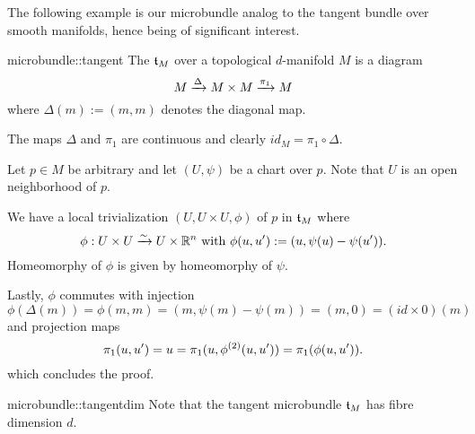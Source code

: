 \begin{myparagraph}
    The following example is our microbundle analog
    to the tangent bundle over smooth manifolds,
    hence being of significant interest.
\end{myparagraph}

\begin{myexample}{microbundle::tangent}
    The  $\mathfrak{t}_M$ over a topological $d$-manifold $M$ is a diagram
    \[ M \xrightarrow{\Delta} M \times M \xrightarrow{\pi_1} M{} \]
    where $\Delta(m) := (m, m)$ denotes the diagonal map.
\end{myexample}

\begin{myproof}
    The maps $\Delta$ and $\pi_1$ are continuous and clearly $id_M = \pi_1 \circ \Delta$.

    Let $p \in M$ be arbitrary and let $(U, \psi)$ be a chart over $p$.
    Note that $U$ is an open neighborhood of $p$.
    
    We have a local trivialization $(U, U \times U, \phi)$ of $p$ in $\mathfrak{t}_M$ where
    \[ \phi: U \times U \xrightarrow{\sim} U \times \mathbb{R}^n \text{ with } \phi(u, u') := (u, \psi(u) - \psi(u')). \]
    Homeomorphy of $\phi$ is given by homeomorphy of $\psi$.

    Lastly, $\phi$ commutes with injection
    \[ \phi(\Delta(m)) = \phi(m, m) = (m, \psi(m) - \psi(m)) = (m, 0) = (id \times 0)(m)\]
    and projection maps
    \[ \pi_1(u, u') = u = \pi_1(u, \phi^{(2)}(u, u')) = \pi_1(\phi(u, u')). \]
    which concludes the proof.
\end{myproof}

\begin{myremark}{microbundle::tangentdim}
    Note that the tangent microbundle $\mathfrak{t}_M$ has fibre dimension $d$.
\end{myremark}